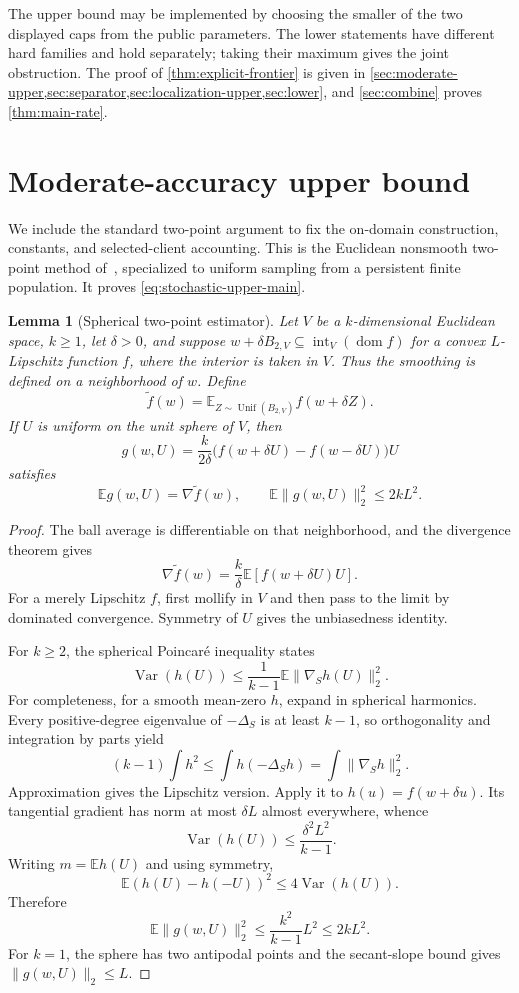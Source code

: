 \documentclass[11pt]{article}
\numberwithin{equation}{section}
\newtheorem{lemma}[lemma]{Lemma}
\theoremstyle{remark}
\theoremstyle{definition}
\newcommand{\E}{\mathbb{E}}
\newcommand{\norm}[1]{\lVert #1\rVert_2}
\begin{document}
The upper bound may be implemented by choosing the smaller of the two
displayed caps from the public parameters. The lower statements have
different hard families and hold separately; taking their maximum
gives the joint obstruction. The proof of
\cref{thm:explicit-frontier} is given in
\cref{sec:moderate-upper,sec:separator,sec:localization-upper,sec:lower},
and \cref{sec:combine} proves \cref{thm:main-rate}.

\section{Moderate-accuracy upper bound}
\label{sec:moderate-upper}

We include the standard two-point argument to fix the on-domain
construction, constants, and selected-client accounting. This is the
Euclidean nonsmooth two-point method of~\cite{shamir2017}, specialized
to uniform sampling from a persistent finite population. It proves
\eqref{eq:stochastic-upper-main}.

\begin{lemma}[Spherical two-point estimator]
\label{lem:spherical-estimator}
Let $V$ be a $k$-dimensional Euclidean space, $k\ge1$, let $\delta>0$, and suppose
$w+\delta B_{2,V}\subseteq\operatorname{int}_V(\operatorname{dom}f)$
for a convex $L$-Lipschitz function $f$, where the interior is taken in $V$.
Thus the smoothing is defined on a neighborhood of $w$. Define
\[
\widetilde f(w)=\E_{Z\sim\operatorname{Unif}(B_{2,V})}f(w+\delta Z).
\]
If $U$ is uniform on the unit sphere of $V$, then
\[
g(w,U)=\frac{k}{2\delta}
\bigl(f(w+\delta U)-f(w-\delta U)\bigr)U
\]
satisfies
\begin{equation}
\E g(w,U)=\nabla\widetilde f(w),
\qquad
\E\norm{g(w,U)}^2\le2kL^2.
\label{eq:spherical-estimator}
\end{equation}
\end{lemma}

\begin{proof}
The ball average is differentiable on that neighborhood, and the divergence theorem gives
\[
\nabla\widetilde f(w)=\frac{k}{\delta}\E[f(w+\delta U)U].
\]
For a merely Lipschitz $f$, first mollify in $V$ and then pass to the limit by dominated convergence.  Symmetry of $U$ gives the unbiasedness identity.

For $k\ge2$, the spherical Poincar\'e inequality states
\[
\operatorname{Var}(h(U))
\le\frac1{k-1}\E\norm{\nabla_S h(U)}^2.
\]
For completeness, for a smooth mean-zero $h$, expand in spherical harmonics.  Every positive-degree eigenvalue of $-\Delta_S$ is at least $k-1$, so orthogonality and integration by parts yield
\[
(k-1)\int h^2\le\int h(-\Delta_Sh)=\int\norm{\nabla_Sh}^2.
\]
Approximation gives the Lipschitz version.  Apply it to $h(u)=f(w+\delta u)$.  Its tangential gradient has norm at most $\delta L$ almost everywhere, whence
\[
\operatorname{Var}(h(U))\le\frac{\delta^2L^2}{k-1}.
\]
Writing $m=\E h(U)$ and using symmetry,
\[
\E(h(U)-h(-U))^2
\le4\operatorname{Var}(h(U)).
\]
Therefore
\[
\E\norm{g(w,U)}^2
\le\frac{k^2}{k-1}L^2\le2kL^2.
\]
For $k=1$, the sphere has two antipodal points and the secant-slope bound gives $\norm{g(w,U)}\le L$.
\end{proof}
\end{document}
